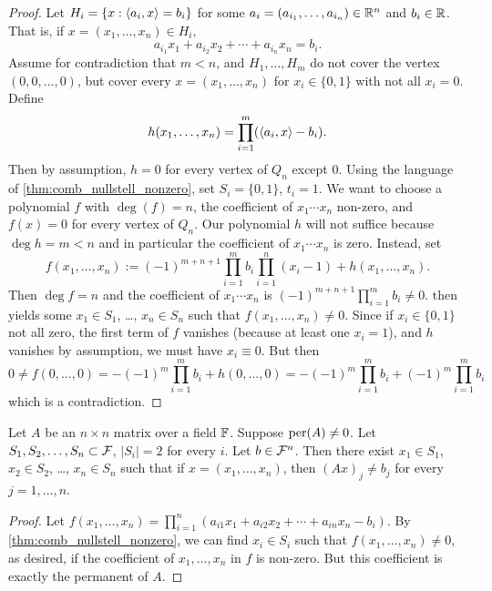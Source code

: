 \begin{proof}	
Let $H_i = \{x: \braket{a_i,x} = b_i\}$ for some $a_i = (a_{i_1},\dotsc,a_{i_n})\in \mathbb{R}^n$ and $b_i\in \mathbb{R}$. That is, if $x=(x_1,\dotsc,x_n)\in H_i$,
\[
a_{i_1}x_1 + a_{i_2}x_2 + \dotsm + a_{i_n}x_n = b_i.
\]
Assume for contradiction that $m<n$, and $H_1,\dotsc,H_m$ do not cover the vertex $(0,0,\dotsc,0)$, but cover every $x = (x_1,\dotsc,x_n)$ for $x_i\in \{0,1\}$ with not all $x_i = 0$. Define
\[
h(x_1,\dotsc,x_n) = \prod_{i=1}^m (\braket{a_i,x} - b_i).
\]
Then by assumption, $h=0$ for every vertex of $Q_n$ except $0$. Using the language of \cref{thm:comb_nullstell_nonzero}, set $S_i = \{0,1\}$, $t_i=1$. We want to choose a polynomial $f$ with $\deg(f)=n$, the coefficient of $x_1\dotsm x_n$ non-zero, and $f(x)=0$ for every vertex of $Q_n$. Our polynomial $h$ will not suffice because $\deg h =m < n$ and in particular the coefficient of $x_1\dotsm x_n$ is zero. Instead, set
\[
f(x_1,\dotsc,x_n) := (-1)^{m+n+1}  \prod_{i=1}^m b_i \prod_{i=1}^n (x_i - 1) + h(x_1,\dotsc,x_n).
\]
Then $\deg f = n$ and the coefficient of $x_1\dotsm x_n$ is $(-1)^{m+n+1} \prod_{i=1}^m b_i \neq 0$.
 then yields some $x_1\in S_1$, \ldots, $x_n \in S_n$ such that $f(x_1,\dotsc,x_n)\neq 0$. Since  if $x_i \in \{0,1\}$ not all zero, the first term of $f$ vanishes (because at least one $x_i=1$), and $h$ vanishes by assumption, we must have $x_i\equiv 0$. But then
\[
0 \neq f(0,\dotsc,0) = -(-1)^{m}  \prod_{i=1}^m b_i + h(0,\dotsc,0) = -(-1)^m \prod_{i=1}^m b_i + (-1)^m \prod_{i=1}^m b_i
\]which is a contradiction.
\end{proof}


\begin{lemma} \label{lem:permanent}
Let $A$ be an $n\times n$ matrix over a field $\mathbb{F}$. Suppose $\operatorname{per}(A)\neq 0$.
Let $S_1,S_2,\dotsc,S_n \subset \mathcal{F}$, $|S_i| = 2$ for every $i$. Let $b\in \mathcal{F}^n$. Then there exist $x_1\in S_1$, $x_2\in S_2$, \ldots, $x_n\in S_n$ such that if $x = (x_1,\dotsc,x_n)$, then $(Ax)_j \neq b_j$ for every $j=1,\dotsc, n$.
\end{lemma}
\begin{proof}	
Let $f(x_1,\dotsc,x_n) = \prod_{i=1}^n (a_{i1}x_1 + a_{i2}x_2 + \dotsm + a_{in}x_n - b_i)$. By \cref{thm:comb_nullstell_nonzero}, we can find $x_i\in S_i$ such that $f(x_1,\dotsc,x_n)\neq 0$, as desired, if the coefficient of $x_1,\dotsc,x_n$ in $f$ is non-zero. But this coefficient is exactly the permanent of $A$.
\end{proof}


